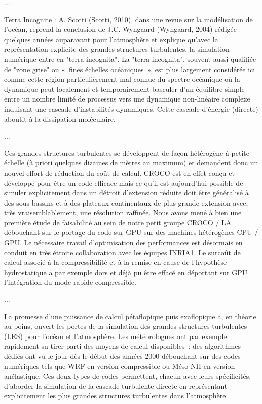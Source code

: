 ...

Terra Incognite : A. Scotti (Scotti, 2010), dans une revue sur la modélisation de l'océan, reprend la conclusion de J.C. Wyngaard (Wyngaard, 2004) rédigée quelques années auparavant pour l'atmosphère et explique qu’avec la représentation explicite des grandes structures turbulentes, la simulation numérique entre en "terra incognita". La "terra incognita", souvent aussi qualifiée de "zone grise" ou « fines échelles océaniques », est plus largement considérée ici comme cette région particulièrement mal connue du spectre océanique où la dynamique peut localement et temporairement basculer d'un équilibre simple entre un nombre limité de processus vers une dynamique non-linéaire complexe induisant une cascade d'instabilités dynamiques. Cette cascade d’énergie (directe) aboutit à la dissipation moléculaire.

...

Ces grandes structures turbulentes se développent de façon hétérogène à petite échelle (à priori quelques dizaines de mètres au maximum) et demandent donc un nouvel effort de réduction du coût de calcul. CROCO est en effet conçu et développé pour être un code efficace mais ce qu'il est aujourd'hui possible de simuler explicitement dans un détroit d'extension réduite doit être généralisé à des sous-bassins et à des plateaux continentaux de plus grande extension avec, très vraisemblablement, une résolution raffinée. Nous avons mené à bien une première étude de faisabilité au sein de notre petit groupe CROCO / LA débouchant sur le portage du code sur GPU sur des machines hétérogènes CPU / GPU. Le nécessaire travail d’optimisation des performances est désormais en conduit en très étroite collaboration avec les équipes INRIA1. Le surcoût de calcul associé à la compressibilité et à la remise en cause de l'hypothèse hydrostatique a par exemple dors et déjà pu être effacé en déportant sur GPU l'intégration du mode rapide compressible.

...

La promesse d’une puissance de calcul pétaflopique puis exaflopique a, en théorie au poins, ouvert les portes de la simulation des grandes structures turbulentes (LES) pour l’océan et l’atmosphère. Les météorologues ont par exemple rapidement su tirer parti des moyens de calcul disponibles : des algorithmes dédiés ont vu le jour dès le début des années 2000 débouchant sur des codes numériques tels que WRF en version compressible ou Méso-NH en version anélastique. Ces deux types de codes permettent, chacun avec leurs spécificités, d’aborder la simulation de la cascade turbulente directe en représentant explicitement les plus grandes structures turbulentes dans l’atmosphère.


